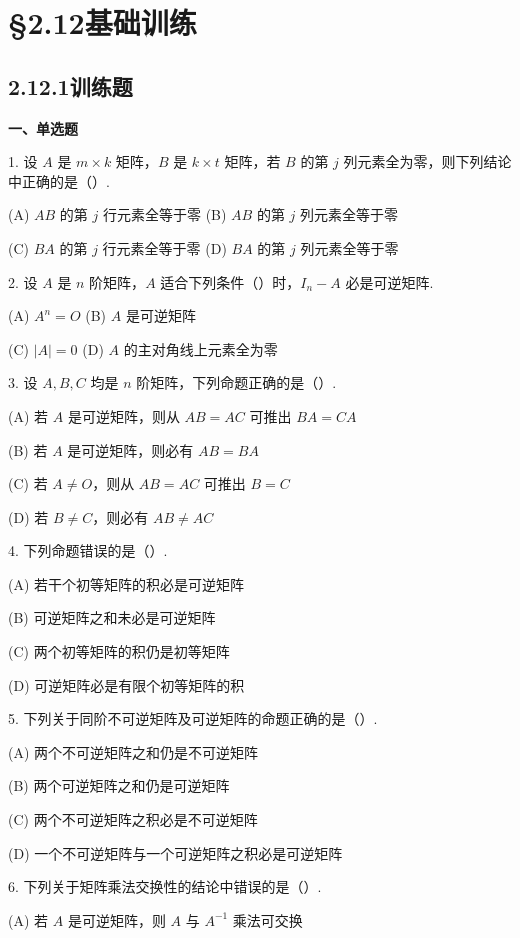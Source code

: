\documentclass[UTF8, 12pt, fontset=fandol, oneside]{ctexart}
\begin{document}
\section*{§2.12\quad 基础训练}

\subsection*{2.12.1\quad 训练题}

\noindent\textbf{一、单选题}

1. 设 $A$ 是 $m\times k$ 矩阵，$B$ 是 $k\times t$ 矩阵，若 $B$ 的第 $j$ 列元素全为零，则下列结论中正确的是（\quad ）.

(A) $AB$ 的第 $j$ 行元素全等于零\qquad
(B) $AB$ 的第 $j$ 列元素全等于零

(C) $BA$ 的第 $j$ 行元素全等于零\qquad
(D) $BA$ 的第 $j$ 列元素全等于零

2. 设 $A$ 是 $n$ 阶矩阵，$A$ 适合下列条件（\quad ）时，$I_n-A$ 必是可逆矩阵.

(A) $A^n=O$\qquad
(B) $A$ 是可逆矩阵

(C) $|A|=0$\qquad
(D) $A$ 的主对角线上元素全为零

3. 设 $A,B,C$ 均是 $n$ 阶矩阵，下列命题正确的是（\quad ）.

(A) 若 $A$ 是可逆矩阵，则从 $AB=AC$ 可推出 $BA=CA$

(B) 若 $A$ 是可逆矩阵，则必有 $AB=BA$

(C) 若 $A\ne O$，则从 $AB=AC$ 可推出 $B=C$

(D) 若 $B\ne C$，则必有 $AB\ne AC$

4. 下列命题错误的是（\quad ）.

(A) 若干个初等矩阵的积必是可逆矩阵

(B) 可逆矩阵之和未必是可逆矩阵

(C) 两个初等矩阵的积仍是初等矩阵

(D) 可逆矩阵必是有限个初等矩阵的积

5. 下列关于同阶不可逆矩阵及可逆矩阵的命题正确的是（\quad ）.

(A) 两个不可逆矩阵之和仍是不可逆矩阵

(B) 两个可逆矩阵之和仍是可逆矩阵

(C) 两个不可逆矩阵之积必是不可逆矩阵

(D) 一个不可逆矩阵与一个可逆矩阵之积必是可逆矩阵

6. 下列关于矩阵乘法交换性的结论中错误的是（\quad ）.

(A) 若 $A$ 是可逆矩阵，则 $A$ 与 $A^{-1}$ 乘法可交换
\end{document}
